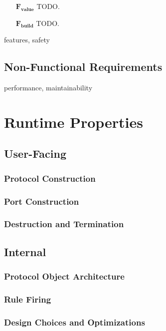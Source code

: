 \begin{enumerate}
	\item[$\boldsymbol{F_{value}}$] TODO.
	\item[$\boldsymbol{F_{build}}$] TODO.
\end{enumerate}

features, safety
\subsection{Non-Functional Requirements}
performance, maintainability
\section{Runtime Properties}
\subsection{User-Facing}
\subsubsection{Protocol Construction}
\subsubsection{Port Construction}
\subsubsection{Destruction and Termination}
\subsection{Internal}
\subsubsection{Protocol Object Architecture}
\subsubsection{Rule Firing}
\subsubsection{Design Choices and Optimizations}